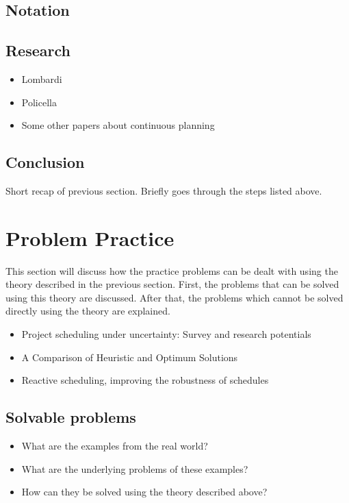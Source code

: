 \documentclass{article}
\begin{document}
\subsection{Notation}


\subsection{Research}

\begin{itemize}
\item Lombardi
\item Policella
\item Some other papers about continuous planning
\end{itemize}

\subsection{Conclusion}

Short recap of previous section. Briefly goes through the steps listed above.

\section{Problem Practice}
This section will discuss how the practice problems can be dealt with using the theory described in the previous section. First, the problems that can be solved using this theory are discussed. After that, the problems which cannot be solved directly using the theory are explained.\\

\begin{itemize}
\item Project scheduling under uncertainty: Survey
and research potentials
\item A Comparison of Heuristic and Optimum Solutions
\item Reactive scheduling, improving the robustness of schedules
\end{itemize}

\subsection{Solvable problems}
\begin{itemize}
\item What are the examples from the real world?
\item What are the underlying problems of these examples?
\item How can they be solved using the theory described above?
\end{itemize}
\end{document}
